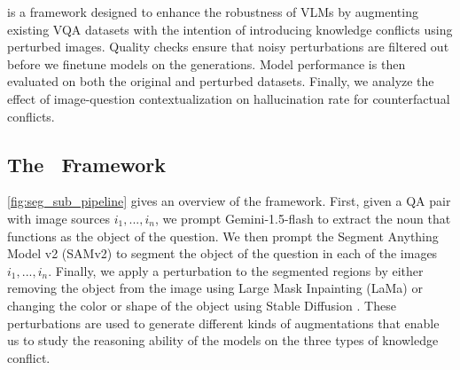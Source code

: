 \begin{table}[t]
    \caption{Distribution of the VQA datasets.}
    \vspace{-2mm}
    \label{tab:org_dataset}
    \centering
    \vspace{-4mm}
\end{table}

\segsub is a framework designed to enhance the robustness of VLMs by augmenting existing VQA datasets with the intention of introducing knowledge conflicts using perturbed images. Quality checks ensure that noisy perturbations are filtered out before we finetune models on the generations. Model performance is then evaluated on both the original and perturbed datasets. Finally, we analyze the effect of image-question contextualization on hallucination rate for counterfactual conflicts.


\subsection{The \segsub~Framework}
\label{sec:framework}
\autoref{fig:seg_sub_pipeline} gives an overview of the framework. First, given a QA pair with image sources $i_1, ..., i_n$, we prompt Gemini-1.5-flash to extract the noun that functions as the object of the question. We then prompt the Segment Anything Model v2 (SAMv2) \citep{ravi_sam_2024, liu_grounding_2024} to segment the object of the question in each of the images $i_1, ..., i_n$. Finally, we apply a perturbation to the segmented regions by either removing the object from the image using Large Mask Inpainting (LaMa) \citep{suvorov_resolution-robust_2022} or changing the color or shape of the object using Stable Diffusion \citep{rombach_high-resolution_2022}. These perturbations are used to generate different kinds of augmentations that enable us to study the reasoning ability of the models on the three types of knowledge conflict.

